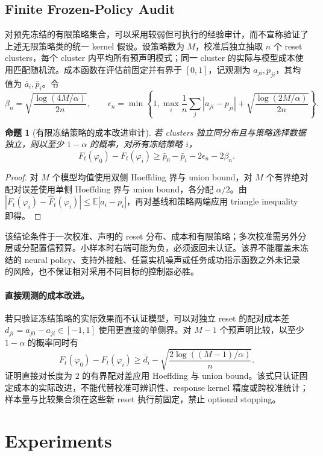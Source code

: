 \documentclass[11pt]{article}
\newtheorem{proposition}{命题}[section]
\begin{document}
\subsection{Finite Frozen-Policy Audit}
对预先冻结的有限策略集合，可以采用较弱但可执行的经验审计，而不宣称验证了上述无限策略类的统一 kernel 假设。设策略数为 $M$，校准后独立抽取 $n$ 个 reset clusters，每个 cluster 内平均所有预声明模式；同一 cluster 的实际与模型成本使用匹配随机流。成本函数在评估前固定并有界于 $[0,1]$，记观测为 $a_{ji},p_{ji}$，其均值为 $\bar a_i,\bar p_i$。令
\[
 \beta_n=\sqrt{\frac{\log(4M/\alpha)}{2n}},\qquad
 \epsilon_n=\min\!\left\{1,\max_i\frac1n\sum_j|a_{ji}-p_{ji}|+
 \sqrt{\frac{\log(2M/\alpha)}{2n}}\right\}.
\]
\begin{proposition}[有限冻结策略的成本改进审计]
若 clusters 独立同分布且与策略选择数据独立，则以至少 $1-\alpha$ 的概率，对所有冻结策略 $i$，
\[
 F_t(\varphi_0)-F_t(\varphi_i)
 \ge\bar p_0-\bar p_i-2\epsilon_n-2\beta_n.
\]
\end{proposition}
\begin{proof}
对 $M$ 个模型均值使用双侧 Hoeffding 界与 union bound，对 $M$ 个有界绝对配对误差使用单侧 Hoeffding 界与 union bound，各分配 $\alpha/2$。由 $|F_t(\varphi_i)-\widehat F_t(\varphi_i)|\le\mathbb E|a_i-p_i|$，再对基线和策略两端应用 triangle inequality 即得。
\end{proof}
该结论条件于一次校准、声明的 reset 分布、成本和有限策略；多次校准需另外分层或分配置信预算。小样本时右端可能为负，必须返回未认证。该界不能覆盖未冻结的 neural policy、支持外接触、任意实机噪声或任务成功指示函数之外未记录的风险，也不保证相对采用不同目标的控制器必胜。

\paragraph{直接观测的成本改进。}
若只验证冻结策略的实际效果而不认证模型，可以对独立 reset 的配对成本差 $d_{ji}=a_{j0}-a_{ji}\in[-1,1]$ 使用更直接的单侧界。对 $M-1$ 个预声明比较，以至少 $1-\alpha$ 的概率同时有
\[
 F_t(\varphi_0)-F_t(\varphi_i)
 \ge \bar d_i-\sqrt{\frac{2\log((M-1)/\alpha)}{n}}.
\]
证明直接对长度为 $2$ 的有界配对差应用 Hoeffding 与 union bound。该式只认证固定成本的实际改进，不能代替校准可辨识性、response kernel 精度或跨校准统计；样本量与比较集合须在这些新 reset 执行前固定，禁止 optional stopping。

\section{Experiments}
\end{document}
